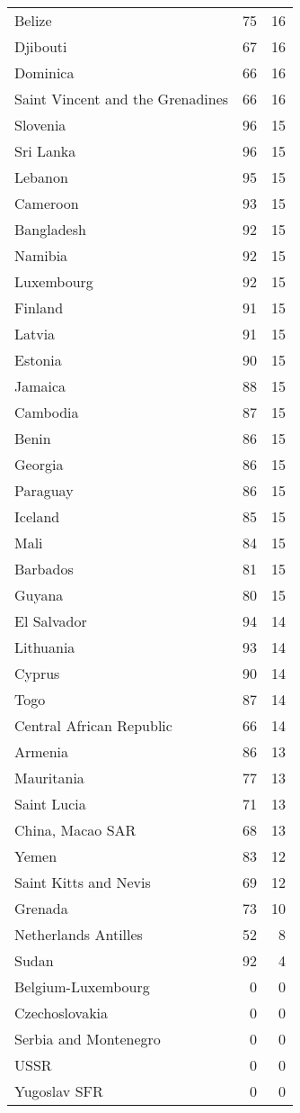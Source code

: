 \documentclass[]{article}
\begin{document}
\begin{longtable}[t]{lrr}
Belize & 75 & 16\\
\addlinespace
Djibouti & 67 & 16\\
Dominica & 66 & 16\\
Saint Vincent and the Grenadines & 66 & 16\\
Slovenia & 96 & 15\\
Sri Lanka & 96 & 15\\
\addlinespace
Lebanon & 95 & 15\\
Cameroon & 93 & 15\\
Bangladesh & 92 & 15\\
Namibia & 92 & 15\\
Luxembourg & 92 & 15\\
\addlinespace
Finland & 91 & 15\\
Latvia & 91 & 15\\
Estonia & 90 & 15\\
Jamaica & 88 & 15\\
Cambodia & 87 & 15\\
\addlinespace
Benin & 86 & 15\\
Georgia & 86 & 15\\
Paraguay & 86 & 15\\
Iceland & 85 & 15\\
Mali & 84 & 15\\
\addlinespace
Barbados & 81 & 15\\
Guyana & 80 & 15\\
El Salvador & 94 & 14\\
Lithuania & 93 & 14\\
Cyprus & 90 & 14\\
\addlinespace
Togo & 87 & 14\\
Central African Republic & 66 & 14\\
Armenia & 86 & 13\\
Mauritania & 77 & 13\\
Saint Lucia & 71 & 13\\
\addlinespace
China, Macao SAR & 68 & 13\\
Yemen & 83 & 12\\
Saint Kitts and Nevis & 69 & 12\\
Grenada & 73 & 10\\
Netherlands Antilles & 52 & 8\\
\addlinespace
Sudan & 92 & 4\\
Belgium-Luxembourg & 0 & 0\\
Czechoslovakia & 0 & 0\\
Serbia and Montenegro & 0 & 0\\
USSR & 0 & 0\\
Yugoslav SFR & 0 & 0\\*
\end{longtable}
\end{document}
